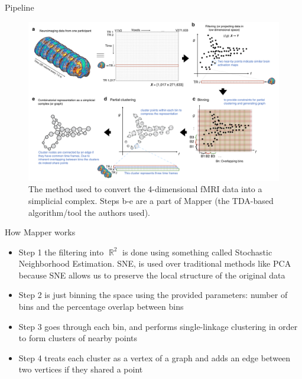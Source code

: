 \documentclass{beamer}
\DeclareMathOperator{\R}{\mathbb{R}}
\begin{document}
\begin{frame}{Pipeline}
    \begin{figure}
        \includegraphics[width = 0.75\linewidth]{fig1.png}
        \caption{The method used to convert the 4-dimensional fMRI data into a simplicial complex. Steps b-e are a part of Mapper (the TDA-based algorithm/tool the authors used).}
    \end{figure}
\end{frame}

\begin{frame}{How Mapper works}
    \begin{itemize}
        \item Step 1 the filtering into $\R^2$ is done using something called Stochastic Neighborhood Estimation. SNE, is used over traditional methods like PCA because SNE allows us to preserve the local structure of the original data \pause %
        \item Step 2 is just binning the space using the provided parameters: number of bins and the percentage overlap between bins\pause
        \item Step 3 goes through each bin, and performs single-linkage clustering in order to form clusters of nearby points\pause 
        \item Step 4 treats each cluster as a vertex of a graph and adds an edge between two vertices if they shared a point\cite{mapper}
    \end{itemize}
\end{frame}
\end{document}
